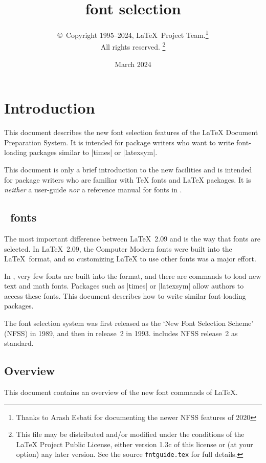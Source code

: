 \documentclass{ltxguide}[1995/11/28]
\title{\LaTeXe{} font selection}
\author{\copyright~Copyright 1995--2024, \LaTeX\ Project
  Team.\thanks{Thanks to Arash Esbati for documenting the
    newer NFSS features of 2020}\\
  All rights reserved.%
  \footnote{This file may be distributed and/or modified under the
    conditions of the \LaTeX{} Project Public License, either version 1.3c
    of this license or (at your option) any later version. See the source
   \texttt{fntguide.tex} for full details.}%
}
\date{March 2024}
\begin{document}
\maketitle

\tableofcontents

\section{Introduction}

This document describes the new font selection features of the \LaTeX{}
Document Preparation System.  It is intended for package writers who
want to write font-loading packages similar to |times| or |latexsym|.

This document is only a brief introduction to the new facilities and is
intended for package writers who are familiar with \TeX{} fonts and
\LaTeX{} packages.  It is \emph{neither} a user-guide \emph{nor} a
reference manual for fonts in \LaTeXe.

\subsection{\LaTeXe~fonts}

The most important difference between \LaTeX~2.09 and \LaTeXe{} is the
way that fonts are selected.  In \LaTeX~2.09, the Computer Modern fonts
were built into the \LaTeX~format, and so customizing \LaTeX{} to use
other fonts was a major effort.

In \LaTeXe, very few fonts are built into the format, and there are
commands to load new text and math fonts.  Packages such as |times| or
|latexsym| allow authors to access these fonts.  This document describes
how to write similar font-loading packages.

The \LaTeXe{} font selection system was first released as the `New Font
Selection Scheme' (NFSS) in 1989, and then in release~2 in 1993.
\LaTeXe{} includes NFSS release~2 as standard.

\subsection{Overview}

This document contains an overview of the new font commands of \LaTeX.
\end{document}
